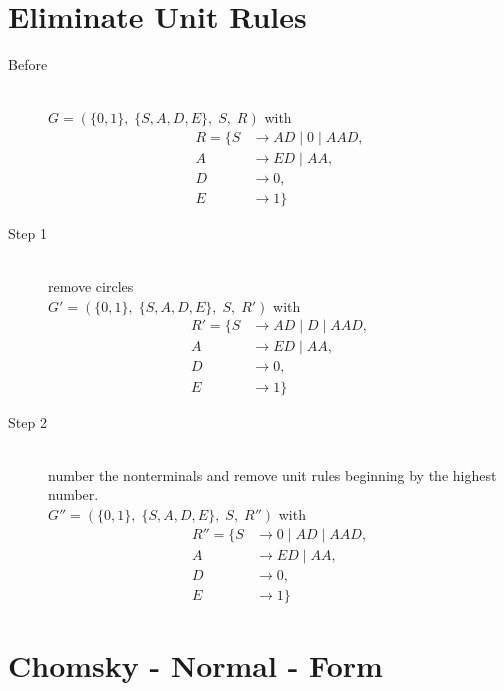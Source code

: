 \documentclass{article}
\begin{document}
\section{Eliminate Unit Rules}

\begin{description}
	\item[Before] \hfill \\ 
		$G=\left(\{	0, 1\},\;\{ S, A, D, E\},\;S,\;R\right)$ with
	\begin{align*}
		R=\{	S &\rightarrow AD\;|\;0\;|\;AAD, \\ 
		A &\rightarrow ED\;|\;AA, \\ 
		D &\rightarrow 0, \\ 
		E &\rightarrow 1\}
	\end{align*}
	\item[Step 1] \hfill \\ 
	remove circles\\ 
	$G'=\left(\{	0, 1\},\;\{ S, A, D, E\},\;S,\;R'\right)$ with
	\begin{align*}
		R'=\{	S &\rightarrow AD\;|\;D\;|\;AAD, \\ 
		A &\rightarrow ED\;|\;AA, \\ 
		D &\rightarrow 0, \\ 
		E &\rightarrow 1\}
	\end{align*}
	\item[Step 2] \hfill \\ 
	number the nonterminals and remove unit rules beginning by the highest number.\\ 
	$G''=\left(\{	0, 1\},\;\{ S, A, D, E\},\;S,\;R''\right)$ with
	\begin{align*}
		R''=\{	S &\rightarrow 0\;|\;AD\;|\;AAD, \\ 
		A &\rightarrow ED\;|\;AA, \\ 
		D &\rightarrow 0, \\ 
		E &\rightarrow 1\}
	\end{align*}
\end{description}

\section{Chomsky - Normal - Form}
\end{document}

